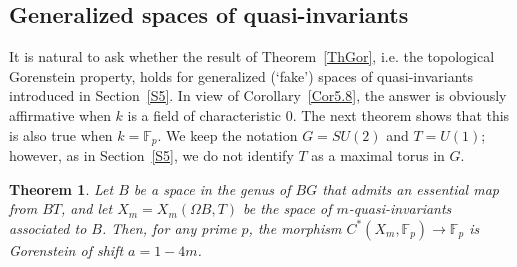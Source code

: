 \documentclass[11pt]{amsart}
\newtheorem{theorem}{Theorem}[section]
\theoremstyle{definition}
\theoremstyle{remark}
\numberwithin{equation}{section}
\newcommand{\la}{\label}
\def\F{\mathbb F}
\begin{document}
\subsection{Generalized spaces of quasi-invariants}
\la{S7.3}
It is natural to ask whether the result of Theorem~\ref{ThGor}, i.e. the topological Gorenstein property, 
holds for generalized (`fake') spaces of quasi-invariants introduced in Section~\ref{S5}.  
In view of Corollary~\ref{Cor5.8}, the answer is obviously affirmative when $k$ is a field of 
characteristic $0$. The next theorem shows that this is also true when $ k = \F_p $. We keep the notation $ G = SU(2) $ and $ T = U(1) $; however, as in Section~\ref{S5}, we do not identify $T$ as a maximal torus in $G$.
%
\begin{theorem}
 \la{ThGor1}
Let $B$ be a space in the genus of $ BG $ that admits an essential map from $BT$, and let $ X_m = X_m(\Omega B,T) $ be the space of $m$-quasi-invariants associated to $B$. Then, for any prime $p$, the morphism
$ C^*(X_m, \F_p) \to \F_p $ is Gorenstein of shift $ a = 1 - 4m $.
\end{theorem}
%
\end{document}
